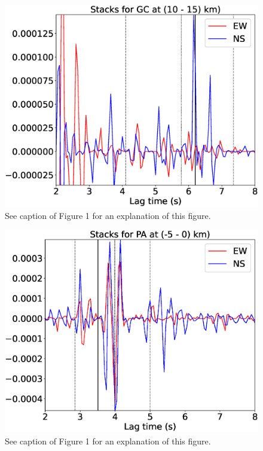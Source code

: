 \documentclass[letterpaper, 12pt]{article}
\begin{document}
\begin{figure}[H]
\includegraphics[width=\linewidth]{figures/intervals/GC_010_015_stacks.eps}
\caption{See caption of Figure 1 for an explanation of this figure.}
\end{figure}

\begin{figure}[H]
\includegraphics[width=\linewidth]{figures/intervals/PA_-05_000_stacks.eps}
\caption{See caption of Figure 1 for an explanation of this figure.}
\end{figure}
\end{document}
